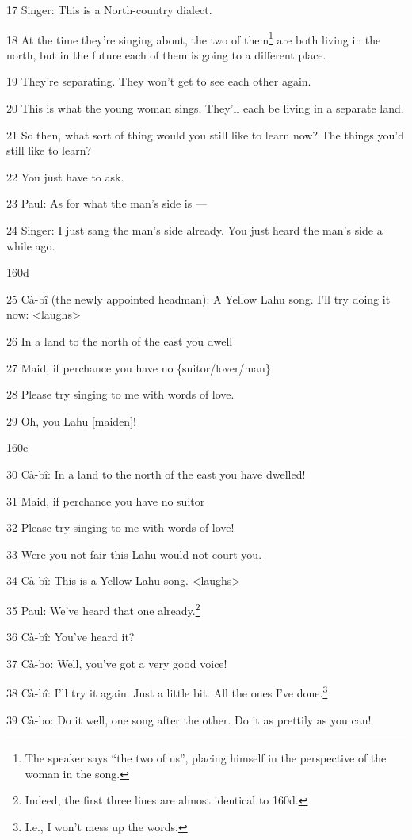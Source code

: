 17 Singer: This is a North-country dialect.

18 At the time they're singing about, the two of them\footnote{The speaker says ``the two of us'', placing himself in the perspective of the woman in the song.} are both living in the
north, but in the future each of them is going to a different place.

19 They're separating. They won't get to see each other again.

20 This is what the young woman sings. They'll each be living in a separate land.

21 So then, what sort of thing would you still like to learn now? The things you'd
still like to learn?

22 You just have to ask.

23 Paul: As for what the man's side is ---

24 Singer: I just sang the man's side already. You just heard the man's side a
while ago.

160d

25 Cà-bî (the newly appointed headman): A Yellow Lahu song. I'll try doing it
now: <laughs>

26 In a land to the north of the east you dwell

27 Maid, if perchance you have no \{suitor/lover/man\}

28 Please try singing to me with words of love.

29 Oh, you Lahu [maiden]!

160e

30 Cà-bî: In a land to the north of the east you have dwelled!

31 Maid, if perchance you have no suitor

32 Please try singing to me with words of love!

33 Were you not fair this Lahu would not court you.

34 Cà-bî: This is a Yellow Lahu song. <laughs>

35 Paul: We've heard that one already.\footnote{Indeed, the first three lines are almost identical to 160d.}

36 Cà-bî: You've heard it?

37 Cà-bo: Well, you've got a very good voice!

38 Cà-bî: I'll try it again. Just a little bit. All the ones I've done.\footnote{I.e., I won't mess up the words.}

39 Cà-bo: Do it well, one song after the other. Do it as prettily as you can!

